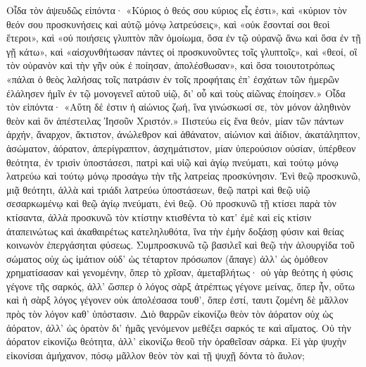 \documentclass[10pt]{book}
\newcommand{\switchGreek}[1][]{\selectlanguage{polutonikogreek} \switchcolumn*[#1]}
\newcommand{\switchEnglish}{\selectlanguage{english} \switchcolumn}
\begin{document}
\begin{paracol}{2}
\switchGreek

Οἶδα τὸν ἀψευδῶς εἰπόντα· «Κύριος ὁ θεός σου κύριος εἷς ἐστι», καὶ «κύριον τὸν θεόν σου προσκυνήσεις καὶ αὐτῷ μόνῳ λατρεύσεις», καὶ «οὐκ ἔσονταί σοι θεοὶ ἕτεροι», καὶ «οὐ ποιήσεις γλυπτὸν πᾶν ὁμοίωμα, ὅσα ἐν τῷ οὐρανῷ ἄνω καὶ ὅσα ἐν τῇ γῇ κάτω», καὶ «αἰσχυνθήτωσαν πάντες οἱ προσκυνοῦντες τοῖς γλυπτοῖς», καὶ «θεοί, οἳ τὸν οὐρανὸν καὶ τὴν γῆν οὐκ ἐ ποίησαν, ἀπολέσθωσαν», καὶ ὅσα τοιουτοτρόπως «πάλαι ὁ θεὸς λαλήσας τοῖς πατράσιν ἐν τοῖς προφήταις ἐπ' ἐσχάτων τῶν ἡμερῶν ἐλάλησεν ἡμῖν ἐν τῷ μονογενεῖ αὐτοῦ υἱῷ, δι' οὗ καὶ τοὺς αἰῶνας ἐποίησεν.»
Οἶδα τὸν εἰπόντα· «Αὕτη δέ ἐστιν ἡ αἰώνιος ζωή, ἵνα γινώσκωσί σε, τὸν μόνον ἀληθινὸν θεὸν καὶ ὃν ἀπέστειλας Ἰησοῦν Χριστόν.»
Πιστεύω εἰς ἕνα θεόν, μίαν τῶν πάντων ἀρχήν, ἄναρχον, ἄκτιστον, ἀνώλεθρον καὶ ἀθάνατον, αἰώνιον καὶ ἀίδιον, ἀκατάληπτον, ἀσώματον, ἀόρατον, ἀπερίγραπτον, ἀσχημάτιστον, μίαν ὑπερούσιον οὐσίαν, ὑπέρθεον θεότητα, ἐν τρισὶν ὑποστάσεσι, πατρὶ καὶ υἱῷ καὶ ἁγίῳ πνεύματι, καὶ τούτῳ μόνῳ λατρεύω καὶ τούτῳ μόνῳ προσάγω τὴν τῆς λατρείας προσκύνησιν.
Ἑνὶ θεῷ προσκυνῶ, μιᾷ θεότητι, ἀλλὰ καὶ τριάδι λατρεύω ὑποστάσεων, θεῷ πατρὶ καὶ θεῷ υἱῷ σεσαρκωμένῳ καὶ θεῷ ἁγίῳ πνεύματι, ἑνὶ θεῷ.
Οὐ προσκυνῶ τῇ κτίσει παρὰ τὸν κτίσαντα, ἀλλὰ προσκυνῶ τὸν κτίστην κτισθέντα τὸ κατ' ἐμὲ καὶ εἰς κτίσιν ἀταπεινώτως καὶ ἀκαθαιρέτως κατεληλυθότα, ἵνα τὴν ἐμὴν δοξάσῃ φύσιν καὶ θείας κοινωνὸν ἐπεργάσηται φύσεως.
Συμπροσκυνῶ τῷ βασιλεῖ καὶ θεῷ τὴν ἁλουργίδα τοῦ σώματος οὐχ ὡς ἱμάτιον οὐδ' ὡς τέταρτον πρόσωπον (ἄπαγε) ἀλλ' ὡς ὁμόθεον χρηματίσασαν καὶ γενομένην, ὅπερ τὸ χρῖσαν, ἀμεταβλήτως· οὐ γὰρ θεότης ἡ φύσις γέγονε τῆς σαρκός, ἀλλ' ὥσπερ ὁ λόγος σὰρξ ἀτρέπτως γέγονε μείνας, ὅπερ ἦν, οὕτω καὶ ἡ σὰρξ λόγος γέγονεν οὐκ ἀπολέσασα τουθ', ὅπερ ἐστί, ταυτι ζομένη δὲ μᾶλλον πρὸς τὸν λόγον καθ' ὑπόστασιν.
Διὸ θαρρῶν εἰκονίζω θεὸν τὸν ἀόρατον οὐχ ὡς ἀόρατον, ἀλλ' ὡς ὁρατὸν δι' ἡμᾶς γενόμενον μεθέξει σαρκός τε καὶ αἵματος.
Οὐ τὴν ἀόρατον εἰκονίζω θεότητα, ἀλλ' εἰκονίζω θεοῦ τὴν ὁραθεῖσαν σάρκα. Εἰ γὰρ ψυχὴν εἰκονίσαι ἀμήχανον, πόσῳ μᾶλλον θεὸν τὸν καὶ τῇ ψυχῇ δόντα τὸ ἄυλον;

\switchEnglish


\end{paracol}
\end{document}
